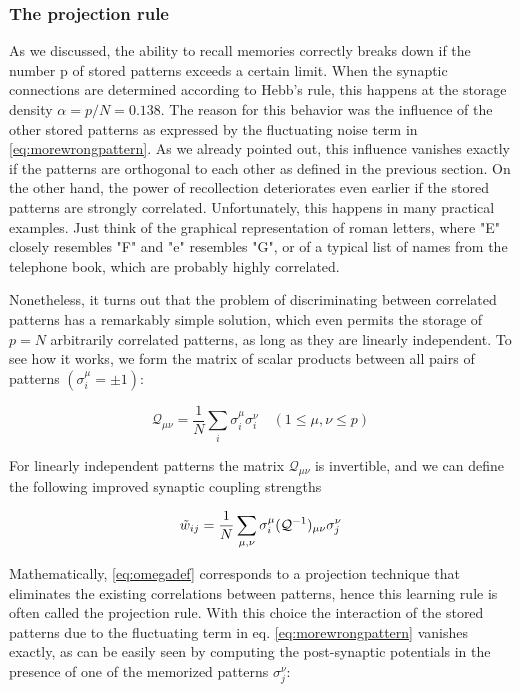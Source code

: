 \subsubsection{The projection rule}
As we discussed, the ability to recall memories correctly breaks down if the number p of stored patterns exceeds a certain limit. When the synaptic connections are determined according to Hebb's rule, this happens at the storage density $\alpha = p/N = 0.138$. 
The reason for this behavior was the influence of the other stored patterns as expressed by the fluctuating noise term in \ref{eq:morewrongpattern}. As we already pointed out, this influence vanishes exactly if the patterns are orthogonal to each other as defined in the previous section. On the other hand, the power of recollection deteriorates even earlier if the stored patterns are strongly correlated. Unfortunately, this happens in many practical examples. Just think of the graphical representation of roman letters, where "E" closely resembles "F" and "e" resembles "G", or of a typical list of names from the telephone book, which are probably highly correlated.

Nonetheless, it turns out that the problem of discriminating between correlated patterns has a remarkably simple solution, which even permits the storage of $p = N$ arbitrarily correlated patterns, as long as they are linearly independent. To see how it works, we form the matrix of scalar products between all pairs of patterns $(\sigma_{i}^{\mu} = \pm 1)$:

\begin{equation}
    \mathcal{Q}_{\mu\nu}=\frac{1}{N}\sum_{i}\sigma^{\mu}_{i}\sigma^{\nu}_{i}\quad (1\leq \mu, \nu\leq p)
\end{equation}

For linearly independent patterns the matrix $ \mathcal{Q}_{\mu\nu}$ is invertible, and we can define the following improved synaptic coupling strengths

\begin{equation}
    \Tilde{w}_{ij}=\frac{1}{N}\sum_{\mu,\nu}\sigma^{\mu}_{i}(\mathcal{Q}^{-1})_{\mu \nu}\sigma^{\nu}_{j}
    \label{eq:omegadef}
\end{equation}

Mathematically, \ref{eq:omegadef} corresponds to a projection technique that eliminates the existing correlations between patterns, hence this learning rule is often called the projection rule. With this choice the interaction of the stored patterns due to the fluctuating term in eq. \ref{eq:morewrongpattern} vanishes exactly, as can be easily seen by computing the post-synaptic potentials in the presence of one of the memorized patterns $\sigma^{\nu}_{j}$:

